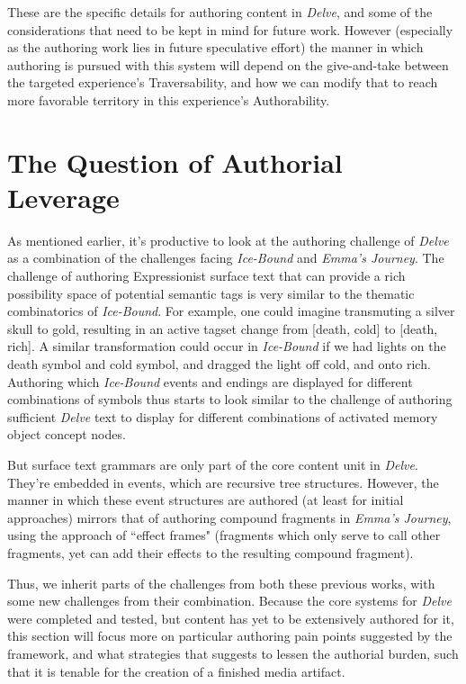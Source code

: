 These are the specific details for authoring content in \textit{Delve}, and some of the considerations that need to be kept in mind for future work. However (especially as the authoring work lies in future speculative effort) the manner in which authoring is pursued with this system will depend on the give-and-take between the targeted experience's Traversability, and how we can modify that to reach more favorable territory in this experience's Authorability.

\section{The Question of Authorial Leverage}\label{sec:delve-the-question-of-authorial-leverage}

As mentioned earlier, it's productive to look at the authoring challenge of \textit{Delve} as a combination of the challenges facing \textit{Ice-Bound} and \textit{Emma's Journey}. The challenge of authoring Expressionist surface text that can provide a rich possibility space of potential semantic tags is very similar to the thematic combinatorics of \textit{Ice-Bound}. For example, one could imagine transmuting a silver skull to gold, resulting in an active tagset change from [death, cold] to [death, rich]. A similar transformation could occur in \textit{Ice-Bound} if we had lights on the death symbol and cold symbol, and dragged the light off cold, and onto rich. Authoring which \textit{Ice-Bound} events and endings are displayed for different combinations of symbols thus starts to look similar to the challenge of authoring sufficient \textit{Delve} text to display for different combinations of activated memory object concept nodes.

But surface text grammars are only part of the core content unit in \textit{Delve}. They're embedded in events, which are recursive tree structures. However, the manner in which these event structures are authored (at least for initial approaches) mirrors that of authoring compound fragments in \textit{Emma's Journey}, using the approach of ``effect frames" (fragments which only serve to call other fragments, yet can add their effects to the resulting compound fragment).

Thus, we inherit parts of the challenges from both these previous works, with some new challenges from their combination. Because the core systems for \textit{Delve} were completed and tested, but content has yet to be extensively authored for it, this section will focus more on particular authoring pain points suggested by the framework, and what strategies that suggests to lessen the authorial burden, such that it is tenable for the creation of a finished media artifact.

